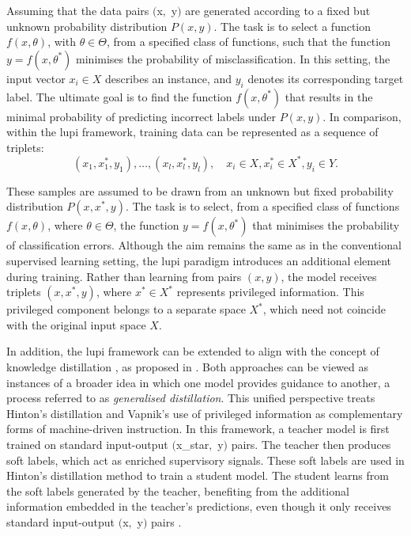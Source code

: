 \noindent Assuming that the data pairs $($\gls{x}$ ,$ \gls{y}$)$ are generated according to a fixed but unknown probability distribution \(P(x, y)\). The task is to select a function \(f(x, \theta)\), with \(\theta \in \Theta\), from a specified class of functions, such that the function \(y = f(x, \theta^*)\) minimises the probability of misclassification. In this setting, the input vector \(x_i \in X\) describes an instance, and \(y_i\) denotes its corresponding target label. The ultimate goal is to find the function \(f(x, \theta^*)\) that results in the minimal probability of predicting incorrect labels under \(P(x, y)\).
In comparison, within the \gls{lupi} framework, training data can be represented as a sequence of triplets:
\begin{equation} \label{eq:lupi_pairs}
(x_1, x_1^*, y_1), \dots, (x_l, x_l^*, y_l), \quad x_i \in X , x_i^* \in X^*, y_i \in Y .
\end{equation}

\noindent These samples are assumed to be drawn from an unknown but fixed probability distribution \( P(x, x^*, y) \). The task is to select, from a specified class of functions \( f(x, \theta) \), where \( \theta \in \Theta \), the function \( y = f(x, \theta^*) \) that minimises the probability of classification errors.
Although the aim remains the same as in the conventional supervised learning setting, the \gls{lupi} paradigm introduces an additional element during training. Rather than learning from pairs \( (x, y) \), the model receives triplets \( (x, x^*, y) \), where \( x^* \in X^* \) represents privileged information. This privileged component belongs to a separate space \( X^* \), which need not coincide with the original input space \( X \).

In addition, the \gls{lupi} framework can be extended to align with the concept of knowledge distillation \cite{hinton_distillation}, as proposed in \cite{lupi_distillation}. Both approaches can be viewed as instances of a broader idea in which one model provides guidance to another, a process referred to as \textit{generalised distillation}. This unified perspective treats Hinton’s distillation \cite{hinton_distillation} and Vapnik’s use of privileged information \cite{lupi} as complementary forms of machine-driven instruction.
In this framework, a teacher model is first trained on standard input-output $($\gls{x_star}$ ,$ \gls{y}$)$  pairs. The teacher then produces soft labels, which act as enriched supervisory signals. These soft labels are used in Hinton’s distillation method to train a student model. The student learns from the soft labels generated by the teacher, benefiting from the additional information embedded in the teacher’s predictions, even though it only receives standard input-output $($\gls{x}$ ,$ \gls{y}$)$  pairs \cite{lupi_distillation}.

